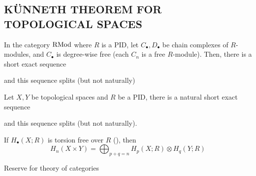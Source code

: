 \subsection{KÜNNETH THEOREM FOR TOPOLOGICAL SPACES}

\begin{theorem}
	In the category $\operatorname{RMod}$ where $R$ is a PID, let $C_\bullet, D_\bullet$ be chain complexes of $R$-modules, and $C_\bullet$ is degree-wise free (each $C_n$ is a free $R$-module). Then, there is a short exact sequence
	\begin{center}
	\end{center}
	and this sequence splits (but not naturally)
\end{theorem}

\begin{theorem}
	Let $X, Y$ be topological spaces and $R$ be a PID, there is a natural short exact sequence
	\begin{center}
	\end{center}
	and this sequence splits (but not naturally).
\end{theorem}

\begin{corollary}
	If $H_\bullet(X; R)$ is torsion free over $R$ (), then
	$$
	H_n(X \times Y) = \bigoplus_{p+q=n} H_p(X; R) \otimes H_q(Y; R)
	$$
\end{corollary}

Reserve for theory of categories
